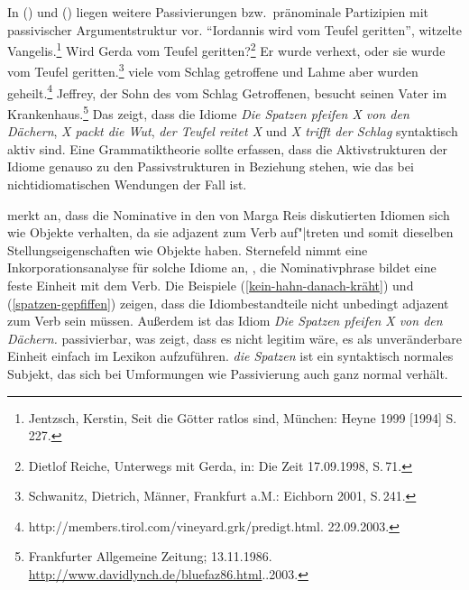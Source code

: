 \noindent
In () und () liegen weitere Passivierungen bzw.\ pränominale Partizipien mit passivischer
Argumentstruktur vor.
\eal
\label{vom-teufel-geritten}
\ex 
"`Iordannis wird vom Teufel geritten"', witzelte Vangelis.\footnote{
Jentzsch, Kerstin, Seit die Götter ratlos sind, München: Heyne 1999 [1994] S.\,227.
}
\ex Wird Gerda vom Teufel geritten?\footnote{
Dietlof Reiche, Unterwegs mit Gerda, in: Die Zeit 17.09.1998, S.\,71.
}
\ex
Er wurde verhext, oder sie wurde vom Teufel geritten.\footnote{
Schwanitz, Dietrich, Männer, Frankfurt a.M.: Eichborn 2001, S.\,241.
}
\zl
\eal
\ex viele vom Schlag getroffene und Lahme aber wurden geheilt.\footnote{
        http://members.tirol.com/vineyard.grk/predigt.html. 22.09.2003.
}
\ex Jeffrey, der Sohn des vom Schlag Getroffenen, besucht seinen Vater im Krankenhaus.\footnote{
         Frankfurter Allgemeine Zeitung; 13.11.1986. \url{http://www.davidlynch.de/bluefaz86.html}..2003.%
}
\zl
Das zeigt, dass die Idiome \emph{Die Spatzen pfeifen X von den Dächern}, \emph{X packt die Wut},
\emph{der Teufel reitet X} und \emph{X trifft der Schlag} syntaktisch aktiv sind. Eine Grammatiktheorie
sollte erfassen, dass die Aktivstrukturen der Idiome genauso zu den Passivstrukturen in Beziehung stehen,
wie das bei nichtidiomatischen Wendungen der Fall ist.

\citet[]{Sternefeld85a} merkt an, dass die Nominative in den von Marga Reis
diskutierten Idiomen sich wie Objekte verhalten, da sie adjazent
zum Verb auf"|treten und somit dieselben Stellungseigenschaften wie Objekte haben.
Sternefeld nimmt eine Inkorporationsanalyse für solche Idiome an,
\dash, die Nominativphrase bildet eine feste Einheit mit dem Verb.
Die Beispiele (\ref{kein-hahn-danach-kräht}) und (\ref{spatzen-gepfiffen}) zeigen, dass die Idiombestandteile nicht unbedingt
adjazent zum Verb sein müssen. Außerdem ist das Idiom \emph{Die Spatzen pfeifen X von den Dächern.} passivierbar, was zeigt, dass
es nicht legitim wäre, es als unveränderbare Einheit einfach im Lexikon aufzuführen.
\emph{die Spatzen} ist ein syntaktisch normales Subjekt, das sich bei Umformungen
wie Passivierung auch ganz normal verhält.

